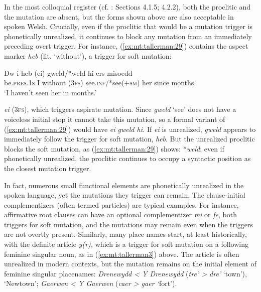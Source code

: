 \documentclass[output=paper,colorlinks,citecolor=brown]{langscibook}
\begin{document}
{In the most colloquial register (cf. \citealt{BorsleyEtAl2007}: Sections 4.1.5; 4.2.2), both the proclitic and the mutation are absent, but the forms shown above are also acceptable in spoken Welsh. Crucially, even if the proclitic that would be a mutation trigger is phonetically unrealized, it continues to block any mutation from an immediately preceding overt trigger. For instance, (\ref{ex:mt:tallerman:29}) contains the aspect marker} {\textit{heb} }{(lit. ‘without’)}{,}{} {a trigger for  soft mutation:} 

\ea\label{ex:mt:tallerman:29}
\gll Dw i heb (ei) gweld/*weld hi ers misoedd\\
be.\textsc{pres.1s} I without (\textsc{3fs}) see.\textsc{inf}/*see(+\textsc{sm}) her since months\\
\glt ‘I haven’t seen her in months.’
\z

 {\textit{ei}}{ (}{\textsc{3fs}}{), which triggers aspirate mutation. Since} {\textit{gweld}}{ ‘see’ does not have a voiceless initial stop it cannot take this mutation, so a formal variant of (\ref{ex:mt:tallerman:29}) would have} {\textit{ei gweld hi.} }{If} {\textit{ei}}{ is unrealized,} {\textit{gweld} }{appears to immediately follow the trigger for  soft mutation,} {\textit{heb}}{. But the unrealized proclitic blocks the  soft mutation, as (\ref{ex:mt:tallerman:29}) shows: *}{\textit{weld}}{; even if phonetically unrealized, the proclitic continues to occupy a syntactic position as the closest mutation trigger.} 

{In fact, numerous  small functional elements are phonetically unrealized in the spoken language, yet the mutations they trigger can remain. The clause-initial complementizers (often termed particles) are typical examples. For instance, affirmative root clauses can have an optional complementizer} {\textit{mi}}{ or} {\textit{fe}}{, both triggers for  soft mutation, and the mutations may remain even when the triggers are not overtly present. Similarly, many place names start, at least historically, with the definite article} {\textit{y(r),}}{ which is a trigger for  soft mutation on a following feminine singular noun, as in (\ref{ex:mt:tallerman3}) above. The article is often unrealized in modern contexts, but the mutation remains on the initial element of feminine singular placenames:} {\textit{Drenewydd < Y Drenewydd} }{(}{\textit{tre’ > dre’} }{‘town’}{),}{ ‘Newtown’;} {\textit{Gaerwen < Y Gaerwen} }{(}{\textit{caer > gaer ‘}}{fort’).} 
\end{document}
